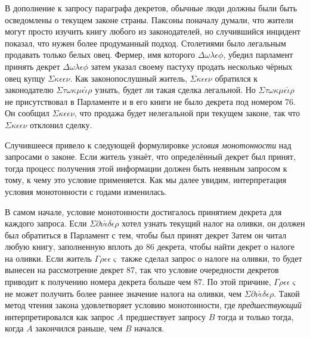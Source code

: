 \documentclass[12pt, a4paper]{article} %
\begin{document}
В дополнение к запросу параграфа декретов, обычные люди должны были быть осведомлены о текущем законе страны. Паксоны поначалу думали, что жители могут просто изучить книгу любого из законодателей, но случившийся инцидент показал, что нужен более продуманный подход. Столетиями было легальным продавать только белых овец. Фермер, имя которого $\Delta\omega\lambda\epsilon\phi$, убедил парламент принять декрет
$\Delta\omega\lambda\epsilon\phi$ затем указал своему пастуху продать несколько чёрных овец купцу $\Sigma\kappa\epsilon\epsilon\nu$. Как законопослушный житель, $\Sigma\kappa\epsilon\epsilon\nu$ обратился к законодателю $\Sigma\tau\omega\kappa\mu\epsilon\check{\iota}\rho$ узнать, будет ли такая сделка легальной. Но $\Sigma\tau\omega\kappa\mu\epsilon\check{\iota}\rho$ не присутствовал в Парламенте и в его книги не было декрета под номером 76. Он сообщил $\Sigma\kappa\epsilon\epsilon\nu$, что продажа будет нелегальной при текущем законе, так что  $\Sigma\kappa\epsilon\epsilon\nu$ отклонил сделку.

Случившееся привело к следующей формулировке \textit{условия монотонности} над запросами о законе.
Если житель узнаёт, что определённый декрет был принят, тогда процесс получения этой информации должен быть неявным запросом к тому, к чему это условие применяется. Как мы далее увидим, интерпретация условия монотонности с годами изменилась.

В самом начале, условие монотонности достигалось принятием декрета для каждого запроса. Если $\Sigma\partial\nu\check{\iota}\delta\epsilon\rho$ хотел узнать текущий налог на оливки, он должен был обратиться в Парламент с тем, чтобы был принят декрет 
Затем он читал любую книгу, заполненную вплоть до 86 декрета, чтобы найти декрет о налоге на оливки. Если житель $\Gamma\rho\epsilon\epsilon\varsigma$ также сделал запрос о налоге на оливки, то будет вынесен на рассмотрение декрет 87, так что условие очередности декретов приводит к получению номера декрета больше чем 87. По этой причине, $\Gamma\rho\epsilon\epsilon\varsigma$ не может получить более раннее значение налога на оливки, чем $\Sigma\partial\nu\check{\iota}\delta\epsilon\rho$. Такой метод чтения закона удовлетворяет условию монотонности, где \textit{предшествующий} интерпретировался как запрос $A$ предшествует запросу $B$ тогда и только тогда, когда $A$ закончился раньше, чем $B$ начался.
\end{document}
